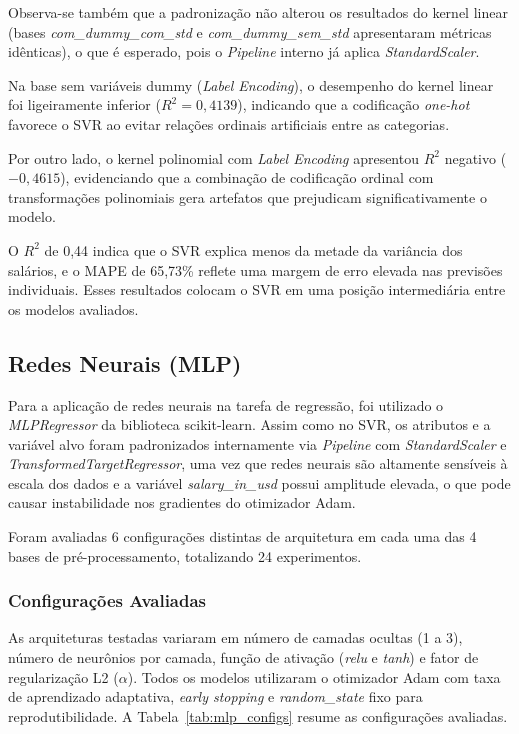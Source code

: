\documentclass[12pt]{article}
\begin{document}
Observa-se também que a padronização não alterou os resultados do kernel linear (bases \textit{com\_dummy\_com\_std} e \textit{com\_dummy\_sem\_std} apresentaram métricas idênticas), o que é esperado, pois o \textit{Pipeline} interno já aplica \textit{StandardScaler}.

Na base sem variáveis dummy (\textit{Label Encoding}), o desempenho do kernel linear foi ligeiramente inferior ($R^2 = 0{,}4139$), indicando que a codificação \textit{one-hot} favorece o SVR ao evitar relações ordinais artificiais entre as categorias.

Por outro lado, o kernel polinomial com \textit{Label Encoding} apresentou $R^2$ negativo ($-0{,}4615$), evidenciando que a combinação de codificação ordinal com transformações polinomiais gera artefatos que prejudicam significativamente o modelo.

O $R^2$ de 0,44 indica que o SVR explica menos da metade da variância dos salários, e o MAPE de 65,73\% reflete uma margem de erro elevada nas previsões individuais. Esses resultados colocam o SVR em uma posição intermediária entre os modelos avaliados.


\subsection{Redes Neurais (MLP)}

Para a aplicação de redes neurais na tarefa de regressão, foi utilizado o \textit{MLPRegressor} da biblioteca scikit-learn. Assim como no SVR, os atributos e a variável alvo foram padronizados internamente via \textit{Pipeline} com \textit{StandardScaler} e \textit{TransformedTargetRegressor}, uma vez que redes neurais são altamente sensíveis à escala dos dados e a variável \textit{salary\_in\_usd} possui amplitude elevada, o que pode causar instabilidade nos gradientes do otimizador Adam.

Foram avaliadas 6 configurações distintas de arquitetura em cada uma das 4 bases de pré-processamento, totalizando 24 experimentos.

\subsubsection{Configurações Avaliadas}

As arquiteturas testadas variaram em número de camadas ocultas (1 a 3), número de neurônios por camada, função de ativação (\textit{relu} e \textit{tanh}) e fator de regularização L2 ($\alpha$). Todos os modelos utilizaram o otimizador Adam com taxa de aprendizado adaptativa, \textit{early stopping} e \textit{random\_state} fixo para reprodutibilidade. A Tabela~\ref{tab:mlp_configs} resume as configurações avaliadas.
\end{document}
